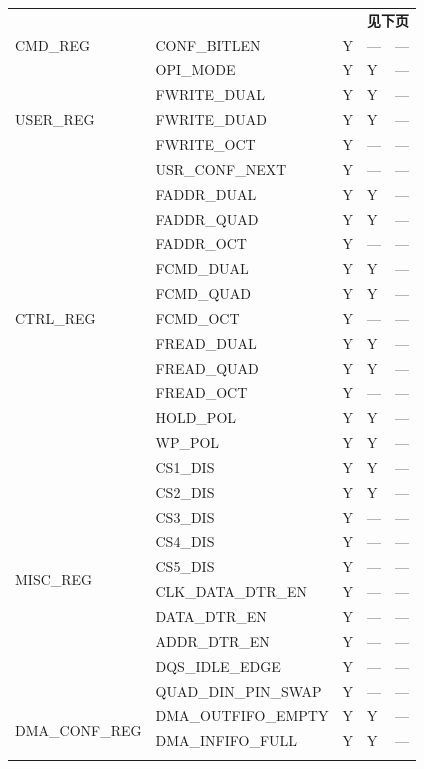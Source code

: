 \documentclass[main\_\_CN.tex]{subfiles}
\begin{document}
\begin{longtable}{|p{4.0cm}|p{6.0cm}|p{1.5cm}|p{1.5cm}|p{1.5cm}|}
    \multicolumn{5}{r}{\textbf{见下页}} \\
    \endfoot
    \endlastfoot
CMD\_REG & CONF\_BITLEN & Y & --- & ---  \\ \hline
\multirow{5}{*}{USER\_REG} & OPI\_MODE & Y & Y & --- \\ \cline{2-5}
& FWRITE\_DUAL & Y & Y & ---   \\ \cline{2-5}
& FWRITE\_DUAD & Y & Y & --- \\ \cline{2-5}
& FWRITE\_OCT & Y & --- & ---  \\ \cline{2-5}
& USR\_CONF\_NEXT & Y & --- & ---  \\ \hline
\multirow{11}{*}{CTRL\_REG} & FADDR\_DUAL & Y & Y & --- \\ \cline{2-5}
& FADDR\_QUAD & Y & Y & --- \\ \cline{2-5}
& FADDR\_OCT & Y & --- & --- \\ \cline{2-5}
& FCMD\_DUAL & Y & Y & --- \\ \cline{2-5}
& FCMD\_QUAD & Y & Y & --- \\ \cline{2-5}
& FCMD\_OCT & Y & --- & --- \\ \cline{2-5}
& FREAD\_DUAL & Y & Y & --- \\ \cline{2-5}
& FREAD\_QUAD & Y & Y & --- \\ \cline{2-5}
& FREAD\_OCT & Y & --- & --- \\ \cline{2-5}
& HOLD\_POL & Y & Y & --- \\ \cline{2-5}
& WP\_POL & Y & Y & --- \\ \hline
\multirow{10}{*}{MISC\_REG} & CS1\_DIS & Y & Y & --- \\ \cline{2-5}
& CS2\_DIS & Y & Y & --- \\ \cline{2-5}
& CS3\_DIS & Y & --- & --- \\ \cline{2-5}
& CS4\_DIS & Y & --- & --- \\ \cline{2-5}
& CS5\_DIS & Y & --- & --- \\ \cline{2-5}
& CLK\_DATA\_DTR\_EN & Y & --- & --- \\  \cline{2-5}
& DATA\_DTR\_EN & Y & --- & --- \\ \cline{2-5}
& ADDR\_DTR\_EN & Y & --- & --- \\ \cline{2-5}
& DQS\_IDLE\_EDGE & Y & --- & --- \\ \cline{2-5}
& QUAD\_DIN\_PIN\_SWAP & Y & --- & --- \\ \hline
\multirow{9}{*}{DMA\_CONF\_REG} & DMA\_OUTFIFO\_EMPTY & Y & Y & --- \\ \cline{2-5}
& DMA\_INFIFO\_FULL & Y & Y & --- \\ \cline{2-5}

\end{longtable}
\end{document}
